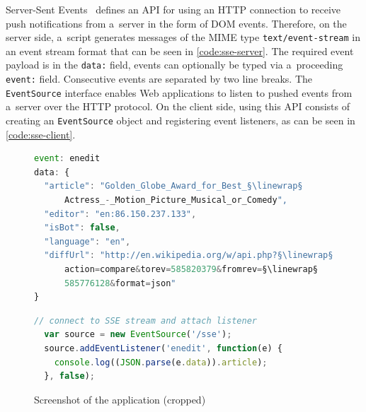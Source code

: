 \documentclass{sig-alternate}
\newcommand{\linewrap}{\raisebox{-.6ex}{\textcolor{grey}{$\hookleftarrow$}}}
\begin{document}
Server-Sent Events~\cite{hickson2012sse}
defines an API for using an HTTP connection
to receive push notifications from a~server
in the form of DOM events.
Therefore, on the server side, a~script generates messages
of the MIME type \texttt{text/event-stream}
in an event stream format that can be seen
in \autoref{code:sse-server}.
The required event payload is in the \texttt{data:} field,
events can optionally be typed via a~proceeding \texttt{event:} field.
Consecutive events are separated by two line breaks.
The \texttt{EventSource} interface enables Web applications
to listen to pushed events from a~server over the HTTP protocol.
On the client side, using this API consists of creating
an \texttt{EventSource} object and registering event listeners,
as can be seen in \autoref{code:sse-client}.

\begin{figure}[h!]
  \begin{lstlisting}[caption={Server-Sent Event of type ``enedit''
    (formatted for legibility, \texttt{data:} allows no line breaks)},
    label=code:sse-server, language=JavaScript]
event: enedit
data: {
  "article": "Golden_Globe_Award_for_Best_§\linewrap§
      Actress_-_Motion_Picture_Musical_or_Comedy",
  "editor": "en:86.150.237.133",
  "isBot": false,
  "language": "en",
  "diffUrl": "http://en.wikipedia.org/w/api.php?§\linewrap§
      action=compare&torev=585820379&fromrev=§\linewrap§
      585776128&format=json"
}
  \end{lstlisting}
  
  \vspace{-1.5em}
  \begin{lstlisting}[caption={\texttt{EventSource}
    object with event listener},
    label=code:sse-client, language=JavaScript]
  // connect to SSE stream and attach listener
  var source = new EventSource('/sse');
  source.addEventListener('enedit', function(e) {
    console.log((JSON.parse(e.data)).article);
  }, false);
  \end{lstlisting}

  \vspace{-0.5em}
  \caption{Screenshot of the application (cropped)}
  \label{fig:screenshot}
\end{figure}
\end{document}
